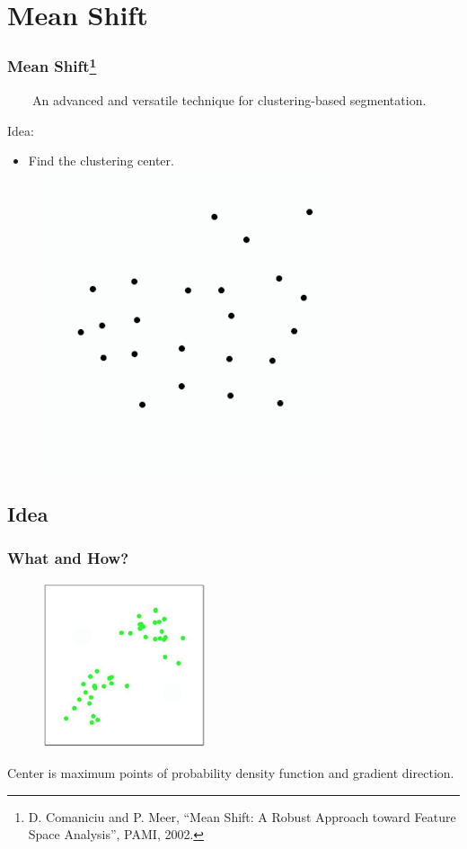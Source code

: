 \documentclass[notheorems,serif,table,compress]{beamer}  %
\begin{document}

\section{Mean Shift}


\begin{frame}
\frametitle{Mean Shift\footnote{D. Comaniciu and P. Meer, ``Mean Shift: A Robust Approach toward Feature Space Analysis'', PAMI, 2002. }}
~~~~An advanced and versatile technique for clustering-based segmentation.\newline

{\color{blue}Idea:}
    \begin{itemize}
    \item Find the {\color{blue}clustering center}. 
    \end{itemize}
    \begin{figure}
      \includegraphics[width=0.25\linewidth]{julei.png} 
    \end{figure}
\end{frame}

\subsection{Idea}
\begin{frame}
\frametitle{What and How?}
    \begin{figure}
      \includegraphics[width=0.25\linewidth]{zhong.png} 
    \end{figure}
    \pause
Center is maximum points of probability density function and gradient direction.\newline
\end{frame}
\end{document}
